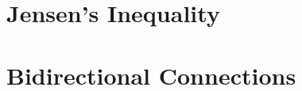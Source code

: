 \documentclass{scrreprt}
\begin{document}


\section{Jensen's Inequality}



\section{Bidirectional Connections}


\end{document}
